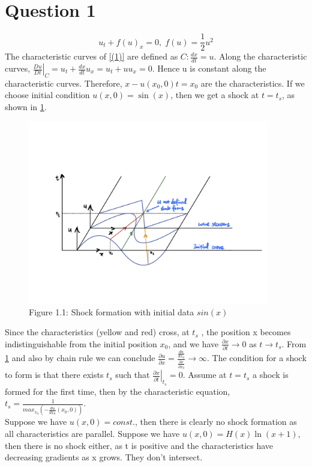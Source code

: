\documentclass[a4paper,11pt]{article}
\begin{document}
\section{Question 1}
\begin{equation}
u_t + f(u)_x = 0, \; f(u) = \frac{1}{2} u^2
\label{(1)}
\end{equation}
The characteristic curves of \ref{(1)} are defined as $C:
\frac{dx}{dt} = u$. Along the characteristic curves, $\left. \frac{Du}{Dt} \right |_{C} = u_t  + \frac{dx}{dt} u_x = u_t + uu_x = 0$. Hence u is constant along the characteristic curves. Therefore, $x - u(x_0,0)t = x_0$ are the characteristics.
If we choose initial condition $u(x,0) = \sin(x)$, then we get a shock at $t = t_s$, as shown in \ref{Q1(1)}.
\begin{figure}[H]
 \center
 \includegraphics[width = 0.9\linewidth, height =8cm]{Q1.jpg}
 \caption{Figure 1.1: Shock formation with initial data $sin(x)$}
 \label{Q1(1)}
\end{figure}
Since the characteristics (yellow and red) cross,  at $t_s$ , the position x becomes indistinguishable from the initial position $x_0$, and we have $\frac{\partial x}{\partial t} \to 0$ as $t \to t_s$. From \ref{Q1(1)} and also by chain rule we can conclude $\frac{\partial u}{\partial x} = \frac{\frac{du}{dx_0}}{\frac{\partial x}{\partial x_0}} \to \infty$. The condition for a shock to form is that there exists $t_s$ such that $\left. \frac{\partial x}{\partial t}  \right|_{t_s} = 0$. Assume at $t = t_s$ a shock is formed for the first time, then by the characteristic equation, $t_s = \frac{1}{max_{x_0}\left(-\frac{du}{dx_0}(x_0,0)\right)}$.\\
Suppose we have $u(x,0) = const.$, then there is clearly no shock formation as all characteristics are parallel. Suppose we have $u(x,0) = H(x)\ln(x+1)$, then there is no shock either, as t is positive and the characteristics have decreasing gradients as x grows. They don't intersect. 
\end{document}
